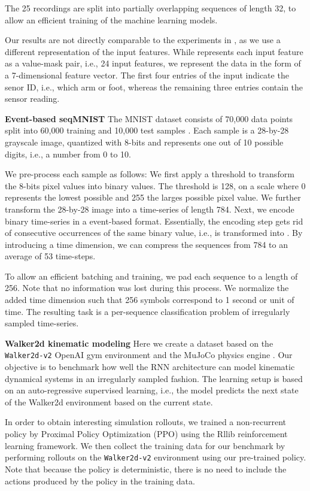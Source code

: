 \documentclass{article}
\begin{document}
The 25 recordings are split into partially overlapping sequences of length 32, to allow an efficient training of the machine learning models. 

Our results are not directly comparable to the experiments in \cite{rubanova2019latent}, as we use a different representation of the input features. While \cite{rubanova2019latent} represents each input feature as a value-mask pair, i.e., 24 input features, we represent the data in the form of a 7-dimensional feature vector.
The first four entries of the input indicate the senor ID, i.e., which arm or foot, whereas the remaining three entries contain the sensor reading.

\textbf{Event-based seqMNIST}
The MNIST dataset consists of 70,000 data points split into 60,000 training and 10,000 test samples \cite{lecun1998gradient}. 
Each sample is a 28-by-28 grayscale image, quantized with 8-bits and represents one out of 10 possible digits, i.e., a number from 0 to 10.

We pre-process each sample as follows:
We first apply a threshold to transform the 8-bits pixel values into binary values. The threshold is 128, on a scale where 0 represents the lowest possible and 255 the larges possible pixel value.
We further transform the 28-by-28 image into a time-series of length 784. 
Next, we encode binary time-series in a event-based format. Essentially, the encoding step gets rid of consecutive occurrences of the same binary value, i.e.,  is transformed into .
By introducing a time dimension, we can compress the sequences from 784 to an average of 53 time-steps.

To allow an efficient batching and training, we pad each sequence to a length of 256. Note that no information was lost during this process.
We normalize the added time dimension such that 256 symbols correspond to 1 second or unit of time.
The resulting task is a per-sequence classification problem of irregularly sampled time-series.

\textbf{Walker2d kinematic modeling}
Here we create a dataset based on the \texttt{Walker2d-v2} OpenAI gym \cite{gym} environment and the MuJoCo physics engine \cite{todorov2012mujoco}.
Our objective is to benchmark how well the RNN architecture can model kinematic dynamical systems in an irregularly sampled fashion.
The learning setup is based on an auto-regressive supervised learning, i.e., the model predicts the next state of the Walker2d environment based on the current state.

In order to obtain interesting simulation rollouts, we trained a non-recurrent policy by Proximal Policy Optimization (PPO) \cite{schulman2017proximal} using the Rllib \cite{liang2018rllib} reinforcement learning framework. We then collect the training data for our benchmark by performing rollouts on the \texttt{Walker2d-v2} environment using our pre-trained policy. Note that because the policy is deterministic, there is no need to include the actions produced by the policy in the training data.
\end{document}
